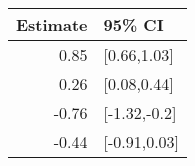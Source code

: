 \begin{tabular}{rl}
  \hline
Estimate & 95\% CI \\ 
  \hline
0.85 & [0.66,1.03] \\ 
  0.26 & [0.08,0.44] \\ 
  -0.76 & [-1.32,-0.2] \\ 
  -0.44 & [-0.91,0.03] \\ 
   \hline
\end{tabular}


